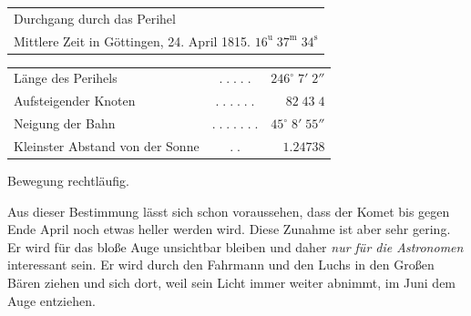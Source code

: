 \begin{center}\fontsize{10}{12}\selectfont\setlength{\tabcolsep}{3pt}\renewcommand{\arraystretch}{1.15}\begin{tabular}{l}
Durchgang durch das Perihel\\
\quad Mittlere Zeit in Göttingen, 24. April 1815. $16^{\mathrm u}\;37^{\mathrm m}\;34^{\mathrm s}$\\
\end{tabular}\end{center}
\begin{center}\fontsize{10}{12}\selectfont\setlength{\tabcolsep}{3pt}\renewcommand{\arraystretch}{1.15}\begin{tabular}{lcr}
Länge des Perihels & $.\;.\;.\;.\;.$ & $246^\circ\;7'\;2''$\\
Aufsteigender Knoten & $.\;.\;.\;.\;.\;.$ & $82\;43\;4$\\
Neigung der Bahn & $.\;.\;.\;.\;.\;.\;.$ & $45^\circ\;8'\;55''$\\
Kleinster Abstand von der Sonne & $.\;.$ & $1.24738$\\
\end{tabular}\end{center}
\noindent Bewegung rechtläufig.

\par\indent Aus dieser Bestimmung lässt sich schon voraussehen, dass der Komet bis gegen Ende April noch etwas heller werden wird. Diese Zunahme ist aber sehr gering. Er wird für das bloße Auge unsichtbar bleiben und daher \emph{nur für die Astronomen} interessant sein. Er wird durch den Fahrmann und den Luchs in den Großen Bären ziehen und sich dort, weil sein Licht immer weiter abnimmt, im Juni dem Auge entziehen.
